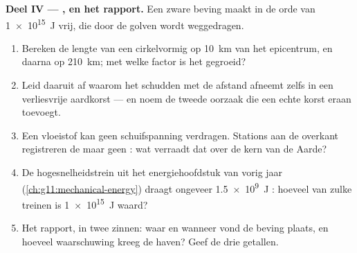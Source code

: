 \begin{problem}
\medskip
\noindent\textbf{Deel IV --- , en het rapport.}
Een zware beving maakt in de orde van \qty{1e15}{J} vrij, die door de
golven wordt weggedragen.
\begin{enumerate}[resume]
  \item Bereken de lengte van een cirkelvormig  op \qty{10}{km}
        van het epicentrum, en daarna op \qty{210}{km}; met welke factor
        is het gegroeid?
  \item Leid daaruit af waarom het schudden met de afstand afneemt zelfs
        in een verliesvrije aardkorst --- en noem de tweede oorzaak die
        een echte korst eraan toevoegt.
  \item Een vloeistof kan geen schuifspanning verdragen. Stations aan de
        overkant registreren de  maar geen : wat verraadt dat
        over de kern van de Aarde?
  \item De hogesnelheidstrein uit het energiehoofdstuk van vorig jaar
        (\cref{ch:g11:mechanical-energy}) draagt ongeveer \qty{1.5e9}{J}
        : hoeveel van zulke treinen is \qty{1e15}{J}
        waard?
  \item Het rapport, in twee zinnen: waar en wanneer vond de beving
        plaats, en hoeveel waarschuwing kreeg de haven? Geef de drie
        getallen.
\end{enumerate}
\end{problem}
